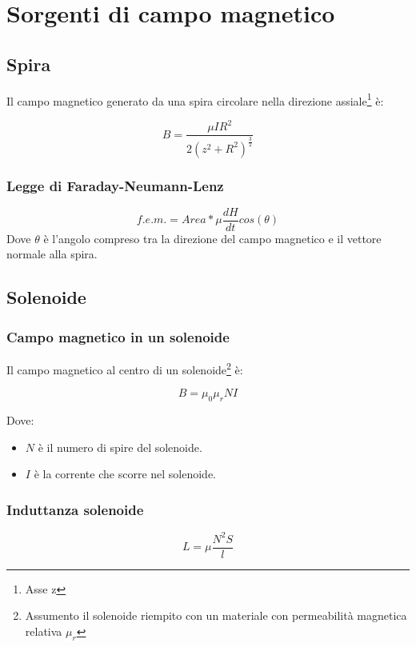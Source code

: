 \documentclass[10pt,a4paper]{report}
\begin{document}
\chapter{Sorgenti di campo magnetico}

	\section{Spira}
			Il campo magnetico generato da una spira circolare nella direzione assiale\footnote{Asse z} è:

			\begin{equation}
			B=\frac{\mu IR^2}{2(z^2+R^2)^{\frac{3}{2}}}
			\end{equation}

		\subsection{Legge di Faraday-Neumann-Lenz}

		\begin{equation}
		f.e.m.=Area* \mu \frac{dH}{dt} cos(\theta) 
		\end{equation}
		Dove $\theta$ è l'angolo compreso tra la direzione del campo magnetico e il vettore normale alla spira.
	\section{Solenoide}
		\subsection{Campo magnetico in un solenoide}
			Il campo magnetico al centro di un solenoide\footnote{Assumento il solenoide riempito con un materiale con permeabilità magnetica relativa $\mu_r$} è:

			\begin{equation}
			B=\mu_0\mu_rNI
			\end{equation}

			Dove:

			\begin{itemize}
			\item $N$ è il numero di spire del solenoide.
			\item $I$ è la corrente che scorre nel solenoide.
			\end{itemize}

		\subsection{Induttanza solenoide}
				\begin{equation} 
				L=\mu \frac{N^2S}{l}
				\label{eq:induttanza-solenoide}
				\end{equation}
\end{document}

